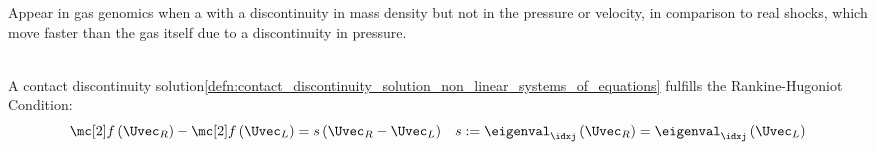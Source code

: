 \begin{explanationbox}\nospacing
    \begin{explanation}
        Appear in gas genomics when a with a discontinuity in mass density but not in the pressure or velocity, in comparison
        to real shocks, which move faster than the gas itself due to a discontinuity in pressure.
    \end{explanation}
\end{explanationbox}
\begin{defnbox}\nospacing
    \begin{defn}\label{defn:rankine-hugoniot_condition_contact_discontinuity}\leavevmode\\
        A contact discontinuity solution\cref{defn:contact_discontinuity_solution_non_linear_systems_of_equations}
        fulfills the Rankine-Hugoniot Condition:
        \begin{align}
          \flux\left(\Uvec_{R}\right)-\flux\left(\Uvec_{L}\right)
          =s \left(\Uvec_{R}-\Uvec_{L}\right)&&s:=\eigenval_{\idxj} \left(\Uvec_{R}\right)=\eigenval_{\idxj} \left(\Uvec_{L}\right)
        \end{align}
    \end{defn}
\end{defnbox}


